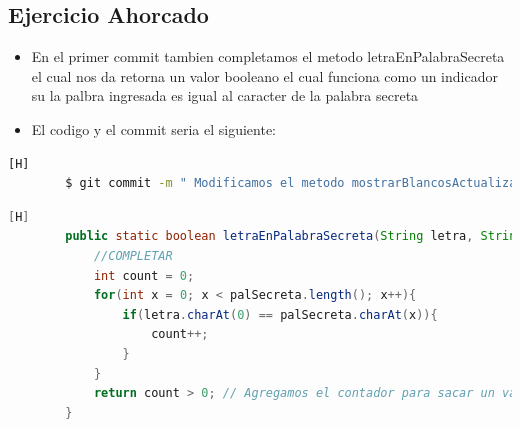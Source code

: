 \documentclass{article}
\begin{document}
	\subsection{Ejercicio Ahorcado}
	\begin{itemize}	
		\item En el primer commit tambien completamos el metodo letraEnPalabraSecreta el cual nos da retorna un valor booleano el cual funciona como un indicador su la palbra ingresada es igual al caracter de la palabra secreta
		\item El codigo y el commit seria el siguiente:
	\end{itemize}	
	\begin{lstlisting}[language=bash,caption={Commit}][H]
		$ git commit -m " Modificamos el metodo mostrarBlancosActualizados y completamos el metodo letraEnPalabraSecreta y agregamos un Mensaje de perdio y cuantos intentos uso"
	\end{lstlisting}	
	\begin{lstlisting}[language=java,caption={Las lineas de codigo del metodo completado;}][H]
        public static boolean letraEnPalabraSecreta(String letra, String palSecreta){
            //COMPLETAR
            int count = 0;
            for(int x = 0; x < palSecreta.length(); x++){
                if(letra.charAt(0) == palSecreta.charAt(x)){
                    count++;    
                }
            }
            return count > 0; // Agregamos el contador para sacar un valor booleano de la letra ingresada
        }
	\end{lstlisting}
\end{document}
